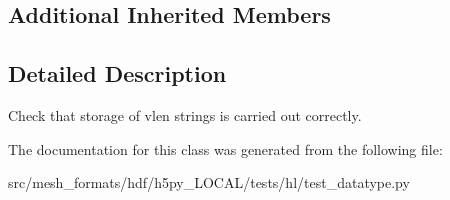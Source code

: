 \subsection*{Additional Inherited Members}


\subsection{Detailed Description}
\begin{DoxyVerb}    Check that storage of vlen strings is carried out correctly.
\end{DoxyVerb}
 

The documentation for this class was generated from the following file\+:\begin{DoxyCompactItemize}
\item 
src/mesh\+\_\+formats/hdf/h5py\+\_\+\+L\+O\+C\+A\+L/tests/hl/test\+\_\+datatype.\+py\end{DoxyCompactItemize}
